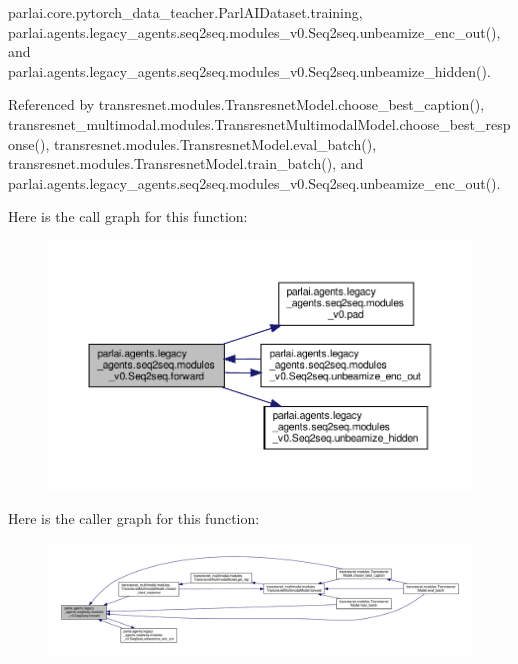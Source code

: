 parlai.\+core.\+pytorch\+\_\+data\+\_\+teacher.\+Parl\+A\+I\+Dataset.\+training, parlai.\+agents.\+legacy\+\_\+agents.\+seq2seq.\+modules\+\_\+v0.\+Seq2seq.\+unbeamize\+\_\+enc\+\_\+out(), and parlai.\+agents.\+legacy\+\_\+agents.\+seq2seq.\+modules\+\_\+v0.\+Seq2seq.\+unbeamize\+\_\+hidden().



Referenced by transresnet.\+modules.\+Transresnet\+Model.\+choose\+\_\+best\+\_\+caption(), transresnet\+\_\+multimodal.\+modules.\+Transresnet\+Multimodal\+Model.\+choose\+\_\+best\+\_\+response(), transresnet.\+modules.\+Transresnet\+Model.\+eval\+\_\+batch(), transresnet.\+modules.\+Transresnet\+Model.\+train\+\_\+batch(), and parlai.\+agents.\+legacy\+\_\+agents.\+seq2seq.\+modules\+\_\+v0.\+Seq2seq.\+unbeamize\+\_\+enc\+\_\+out().

Here is the call graph for this function\+:
\nopagebreak
\begin{figure}[H]
\begin{center}
\leavevmode
\includegraphics[width=350pt]{classparlai_1_1agents_1_1legacy__agents_1_1seq2seq_1_1modules__v0_1_1Seq2seq_a5c8f9eaa59a088164f0e23de5ca37c67_cgraph}
\end{center}
\end{figure}
Here is the caller graph for this function\+:
\nopagebreak
\begin{figure}[H]
\begin{center}
\leavevmode
\includegraphics[width=350pt]{classparlai_1_1agents_1_1legacy__agents_1_1seq2seq_1_1modules__v0_1_1Seq2seq_a5c8f9eaa59a088164f0e23de5ca37c67_icgraph}
\end{center}
\end{figure}
